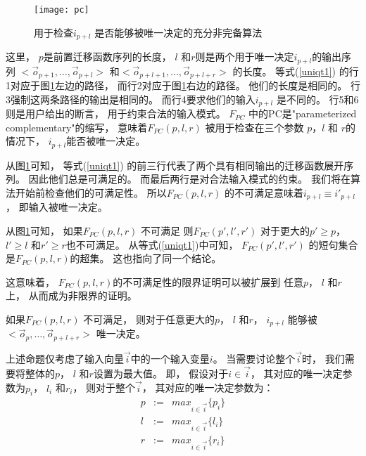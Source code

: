 \begin{figure}[t]
\begin{center}
\texttt{[image: pc]}
\end{center}
\caption{用于检查$i_{p+l}$ 是否能够被唯一决定的充分非完备算法}
  \label{fig_pc_double}
\end{figure}


这里，
$p$是前置迁移函数序列的长度，
$l$ 和$r$则是两个用于唯一决定$i_{p+l}$的输出序列
$<\vec{o}_{p+1},\dots,\vec{o}_{p+l}>$ 和$<\vec{o}_{p+l+1},\dots,\vec{o}_{p+l+r}>$
的长度。
等式(\ref{uniqt1}) 的行1对应于图\ref{fig_pc_double}左边的路径，
而行2对应于图\ref{fig_pc_double}右边的路径。
他们的长度是相同的。
行3强制这两条路径的输出是相同的。
而行4要求他们的输入$i_{p+l}$ 是不同的。
行5和6则是用户给出的断言，
用于约束合法的输入模式。
$F_{PC}$ 中的PC是"parameterized complementary"的缩写，
意味着$F_{PC}(p,l,r)$ 被用于检查在三个参数 $p$，$l$ 和 $r$的情况下，
$i_{p+l}$能否被唯一决定。


从图\ref{fig_pc_double}可知，
等式(\ref{uniqt1}) 的前三行代表了两个具有相同输出的迁移函数展开序列。
因此他们总是可满足的。
而最后两行是对合法输入模式的约束。
我们将在算法开始前检查他们的可满足性。
所以$F_{PC}(p,l,r)$ 的不可满足意味着$i_{p+l}\equiv i'_{p+l}$，
即输入被唯一决定。

从图\ref{fig_pc_double}可知，
如果$F_{PC}(p,l,r)$ 不可满足
则$F_{PC}(p',l',r')$ 对于更大的$p'\ge p$， $l'\ge l$ 和$r'\ge r$也不可满足。
从等式(\ref{uniqt1})中可知，
$F_{PC}(p',l',r')$ 的短句集合是$F_{PC}(p,l,r)$的超集。
这也指向了同一个结论。

这意味着，
$F_{PC}(p,l,r)$的不可满足性的限界证明可以被扩展到
任意$p$， $l$ 和$r$上，
从而成为非限界的证明。

\begin{proposition}\label{prop_pc1}
如果$F_{PC}(p,l,r)$ 不可满足，
则对于任意更大的$p$， $l$ 和$r$，
$i_{p+l}$ 能够被$<\vec{o}_{p},\dots,\vec{o}_{p+l+r}>$ 唯一决定。
\end{proposition}


上述命题仅考虑了输入向量$\vec{i}$中的一个输入变量$i$。
当需要讨论整个$\vec{i}$时，
我们需要将整体的$p$， $l$ 和$r$设置为最大值。
即，
假设对于$i\in\vec{i}$，
其对应的唯一决定参数为$p_i$， $l_i$ 和$r_i$，
则对于整个$\vec{i}$，
其对应的唯一决定参数为：
\begin{equation}\label{equ_maxplr}
\begin{array}{ccc}
p & :=  & max_{i\in\vec{i}} \{p_i\}\\
l & :=  & max_{i\in\vec{i}} \{l_i\}\\
r & :=  & max_{i\in\vec{i}} \{r_i\}
\end{array}
\end{equation}

